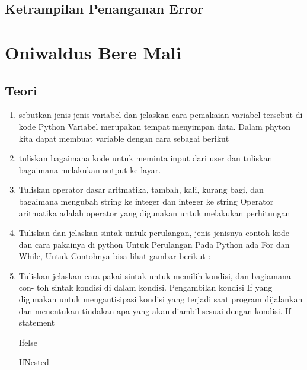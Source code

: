 \subsection{Ketrampilan Penanganan Error}
 

\section{Oniwaldus Bere Mali}
\subsection{Teori}
\begin{enumerate}
\item sebutkan jenis-jenis variabel dan jelaskan cara pemakaian variabel tersebut di
kode Python
Variabel merupakan tempat menyimpan data. Dalam phyton kita dapat membuat variable dengan cara sebagai berikut


\item tuliskan bagaimana kode untuk meminta input dari user dan tuliskan bagaimana
melakukan output ke layar.


\item Tuliskan operator dasar aritmatika, tambah, kali, kurang bagi, dan bagaimana
mengubah string ke integer dan integer ke string
Operator aritmatika adalah operator yang digunakan untuk melakukan perhitungan


\item Tuliskan dan jelaskan sintak untuk perulangan, jenis-jenisnya contoh kode dan
cara pakainya di python
Untuk Perulangan Pada Python ada For dan While, Untuk Contohnya bisa lihat gambar berikut :


\item Tuliskan jelaskan cara pakai sintak untuk memilih kondisi, dan bagiamana con-
toh sintak kondisi di dalam kondisi.
Pengambilan kondisi If yang digunakan untuk mengantisipasi kondisi yang terjadi saat program dijalankan dan menentukan tindakan apa yang akan diambil sesuai dengan kondisi.
If statement

Ifelse

IfNested



\end{enumerate}
